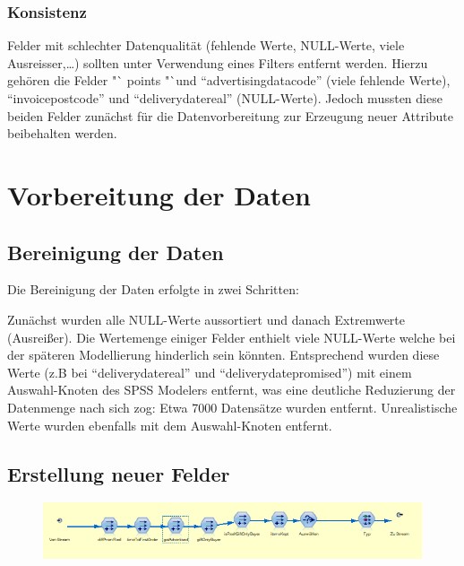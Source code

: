 \documentclass[a4paper,12pt]{article}
\begin{document}
\subsubsection{Konsistenz}
Felder mit schlechter Datenqualität (fehlende Werte, NULL-Werte, viele Ausreisser,\ldots) sollten unter Verwendung eines Filters entfernt werden.
Hierzu gehören die Felder "` points "`und "`advertisingdatacode"' (viele fehlende Werte), "`invoicepostcode"' und "`deliverydatereal"' (NULL-Werte).
Jedoch mussten diese beiden Felder zunächst für die Datenvorbereitung zur Erzeugung neuer Attribute beibehalten werden.

\section{Vorbereitung der Daten}
\subsection{Bereinigung der Daten}
Die Bereinigung der Daten erfolgte in zwei Schritten: 
\par
Zunächst wurden alle NULL-Werte aussortiert und danach Extremwerte (Ausreißer).
Die Wertemenge einiger Felder enthielt viele NULL-Werte welche bei der späteren Modellierung hinderlich sein könnten.
Entsprechend wurden diese Werte (z.B bei "`deliverydatereal"' und "`deliverydatepromised"') mit einem Auswahl-Knoten des SPSS Modelers entfernt, 
was eine deutliche Reduzierung der Datenmenge nach sich zog: Etwa 7000 Datensätze  wurden entfernt.
Unrealistische Werte wurden ebenfalls mit dem Auswahl-Knoten entfernt.

\subsection{Erstellung neuer Felder}
\begin{figure}[h]
	    \centering
				     \includegraphics[width=\textwidth]{Datenvorbereitung.png}
\end{figure}
\end{document}
